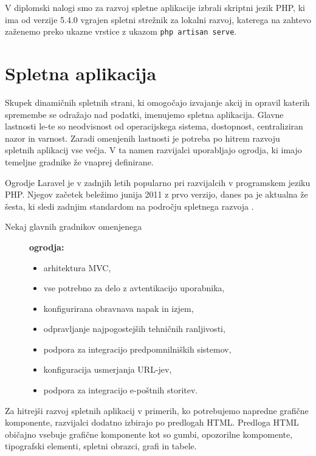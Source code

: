 \documentclass[a4paper, 12pt]{book}
\begin{document}
V diplomski nalogi smo za razvoj spletne aplikacije izbrali skriptni jezik PHP, ki ima od verzije 5.4.0 vgrajen spletni strežnik za lokalni razvoj, katerega na zahtevo zaženemo preko ukazne vrstice z ukazom \verb=php artisan serve=.

\section{Spletna aplikacija}

Skupek dinamičnih spletnih strani, ki omogočajo izvajanje akcij in opravil katerih spremembe se odražajo nad podatki, imenujemo spletna aplikacija. Glavne lastnosti le-te so neodvisnost od operacijskega sistema, dostopnost, centraliziran nazor in varnost. Zaradi omenjenih lastnosti je potreba po hitrem razvoju spletnih aplikacij vse večja. V ta namen razvijalci uporabljajo ogrodja, ki imajo temeljne gradnike že vnaprej definirane.

Ogrodje Laravel je v zadnjih letih popularno pri razvijalcih v programskem jeziku PHP. Njegov začetek beležimo junija 2011 z prvo verzijo, danes pa je aktualna že šesta, ki sledi zadnjim standardom na področju spletnega razvoja \cite{laravel-main-page}. 

\begin{description}
	
	\item[Nekaj glavnih gradnikov omenjenega]\textbf{ogrodja:}
	
	\begin{itemize}
		\item arhitektura MVC,
		\item vse potrebno za delo z avtentikacijo uporabnika,
		\item konfigurirana obravnava napak in izjem,
		\item odpravljanje najpogostejših tehničnih ranljivosti,
		\item podpora za integracijo predpomnilniških sistemov,
		\item konfiguracija usmerjanja URL-jev,
		\item podpora za integracijo e-poštnih storitev.
		
	\end{itemize}
\end{description}

Za hitrejši razvoj spletnih aplikacij v primerih, ko potrebujemo napredne grafične komponente, razvijalci dodatno izbirajo po predlogah HTML. Predloga HTML običajno vsebuje grafične komponente kot so gumbi, opozorilne kompomente, tipografski elementi, spletni obrazci, grafi in tabele.
\end{document}
